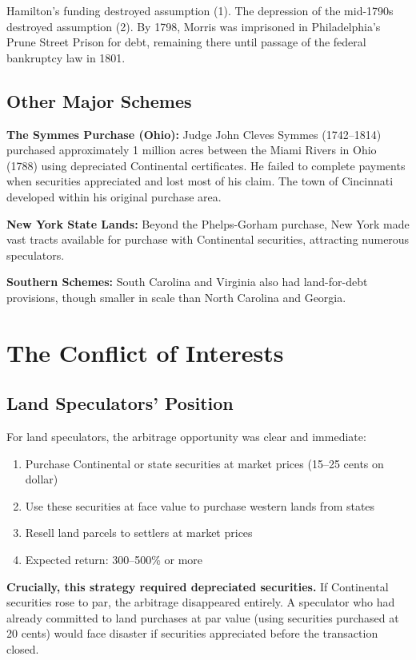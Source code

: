 \documentclass[12pt]{article}
\begin{document}
Hamilton's funding destroyed assumption (1). The depression of the mid-1790s destroyed assumption (2). By 1798, Morris was imprisoned in Philadelphia's Prune Street Prison for debt, remaining there until passage of the federal bankruptcy law in 1801.

\subsection{Other Major Schemes}

\textbf{The Symmes Purchase (Ohio):} Judge John Cleves Symmes (1742--1814) purchased approximately 1 million acres between the Miami Rivers in Ohio (1788) using depreciated Continental certificates. He failed to complete payments when securities appreciated and lost most of his claim. The town of Cincinnati developed within his original purchase area.

\textbf{New York State Lands:} Beyond the Phelps-Gorham purchase, New York made vast tracts available for purchase with Continental securities, attracting numerous speculators.

\textbf{Southern Schemes:} South Carolina and Virginia also had land-for-debt provisions, though smaller in scale than North Carolina and Georgia.

\section{The Conflict of Interests}\label{sec:conflict}

\subsection{Land Speculators' Position}

For land speculators, the arbitrage opportunity was clear and immediate:
\begin{enumerate}
\item Purchase Continental or state securities at market prices (15--25 cents on dollar)
\item Use these securities at face value to purchase western lands from states
\item Resell land parcels to settlers at market prices
\item Expected return: 300--500\% or more
\end{enumerate}

\textbf{Crucially, this strategy required depreciated securities.} If Continental securities rose to par, the arbitrage disappeared entirely. A speculator who had already committed to land purchases at par value (using securities purchased at 20 cents) would face disaster if securities appreciated before the transaction closed.
\end{document}
